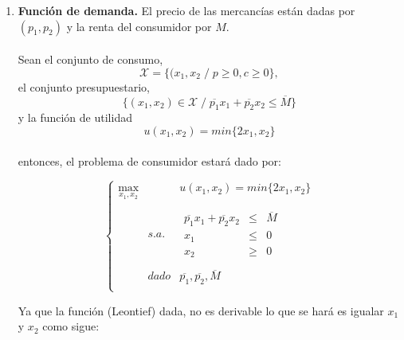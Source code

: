 \begin{enumerate}
\begin{enumerate}[\bfseries a)]
	    \item \textbf{Función de demanda.} El precio de las mercancías están dadas por $(p_1, p_2)$ y la renta del consumidor por $M$.\\\\
		Sean el conjunto de consumo, \\
		$$\mathcal{X} = \lbrace (x_1,x_2 \; / \; p \geq 0, c\geq 0 \rbrace,$$
		el conjunto presupuestario,\\ 
		$$\lbrace(x_1,x_2)\in \mathcal{X} \; / \; \overline{p_1}x_1 + \overline{p_2} x_2 \leq \overline{M}\rbrace$$
		y la función de utilidad \\
		$$u(x_1,x_2) = min\lbrace2x_1,x_2\rbrace$$\\
		entonces, el problema de consumidor estará dado por:\\
		\begin{tcolorbox}[colframe=white]
		$$\left\{\begin{array}{ccc}
			\max\limits_{x_1,x_2}&&u(x_1,x_2)=min\lbrace2x_1,x_2\rbrace\\\\
					     &s.a.&\begin{array}{rcl} \overline{p_1}x_1 + \overline{p_2}x_2&\leq &\overline{M}\\ x_1&\leq&0\\ x_2&\geq & 0 \end{array}\\\\
			   &dado&\overline{p_1},\overline{p_2},\overline{M}\\
		\end{array}\right.$$
		\end{tcolorbox}
		\vspace{1cm}

	    Ya que la función (Leontief) dada, no es derivable lo que se hará es igualar $x_1$ y $x_2$ como sigue:
	    

\end{enumerate}
\end{enumerate}
